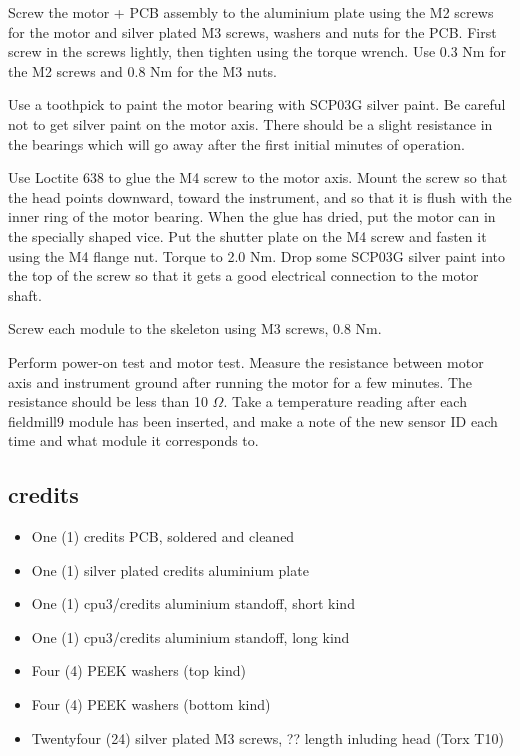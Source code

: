 \documentclass{article}
\begin{document}
Screw the motor + PCB assembly to the aluminium plate using the M2 screws for the motor and silver plated M3 screws, washers and nuts for the PCB.
First screw in the screws lightly, then tighten using the torque wrench. Use 0.3 Nm for the M2 screws and 0.8 Nm for the M3 nuts.

Use a toothpick to paint the motor bearing with SCP03G silver paint.
Be careful not to get silver paint on the motor axis.
There should be a slight resistance in the bearings which will go away after the first initial minutes of operation.

Use Loctite 638 to glue the M4 screw to the motor axis.
Mount the screw so that the head points downward, toward the instrument,
and so that it is flush with the inner ring of the motor bearing.
When the glue has dried, put the motor can in the specially shaped vice.
Put the shutter plate on the M4 screw and fasten it using the M4 flange nut.
Torque to 2.0 Nm.
Drop some SCP03G silver paint into the top of the screw so that it gets a good electrical connection to the motor shaft.

Screw each module to the skeleton using M3 screws, 0.8 Nm.

Perform power-on test and motor test.
Measure the resistance between motor axis and instrument ground after running the motor for a few minutes.
The resistance should be less than 10 $\Omega$.
Take a temperature reading after each fieldmill9 module has been inserted,
and make a note of the new sensor ID each time and what module it corresponds to.

\subsection{credits}

\begin{itemize}
\item One (1) credits PCB, soldered and cleaned
\item One (1) silver plated credits aluminium plate
\item One (1) cpu3/credits aluminium standoff, short kind
\item One (1) cpu3/credits aluminium standoff, long kind
\item Four (4) PEEK washers (top kind)
\item Four (4) PEEK washers (bottom kind)
\item Twentyfour (24) silver plated M3 screws, ?? length inluding head (Torx T10)
\end{itemize}
\end{document}
